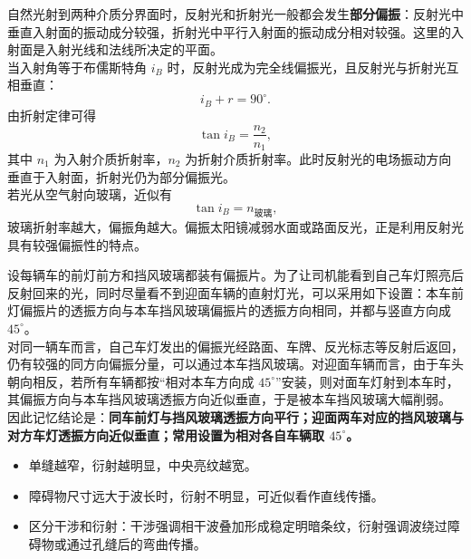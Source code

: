 \begin{casetypebox}[title={\strut\textcolor{white}{\bfseries 常见题型：反射、折射与偏振角}}]
自然光射到两种介质分界面时，反射光和折射光一般都会发生\textbf{部分偏振}：反射光中垂直入射面的振动成分较强，折射光中平行入射面的振动成分相对较强。这里的入射面是入射光线和法线所决定的平面。\\

当入射角等于布儒斯特角 $i_B$ 时，反射光成为完全线偏振光，且反射光与折射光互相垂直：
\[
  i_B+r=90^\circ.
\]
由折射定律可得
\[
  \tan i_B=\frac{n_2}{n_1},
\]
其中 $n_1$ 为入射介质折射率，$n_2$ 为折射介质折射率。此时反射光的电场振动方向垂直于入射面，折射光仍为部分偏振光。\\

若光从空气射向玻璃，近似有
\[
  \tan i_B=n_{\text{玻璃}},
\]
玻璃折射率越大，偏振角越大。偏振太阳镜减弱水面或路面反光，正是利用反射光具有较强偏振性的特点。
\end{casetypebox}

\begin{casetypebox}[title={\strut\textcolor{white}{\bfseries 常见题型：偏振防眩目车灯}}]
设每辆车的前灯前方和挡风玻璃都装有偏振片。为了让司机能看到自己车灯照亮后反射回来的光，同时尽量看不到迎面车辆的直射灯光，可以采用如下设置：本车前灯偏振片的透振方向与本车挡风玻璃偏振片的透振方向相同，并都与竖直方向成 $45^\circ$。\\

对同一辆车而言，自己车灯发出的偏振光经路面、车牌、反光标志等反射后返回，仍有较强的同方向偏振分量，可以通过本车挡风玻璃。对迎面车辆而言，由于车头朝向相反，若所有车辆都按“相对本车方向成 $45^\circ$”安装，则对面车灯射到本车时，其偏振方向与本车挡风玻璃透振方向近似垂直，于是被本车挡风玻璃大幅削弱。\\

因此记忆结论是：\textbf{同车前灯与挡风玻璃透振方向平行；迎面两车对应的挡风玻璃与对方车灯透振方向近似垂直；常用设置为相对各自车辆取 $45^\circ$。}
\end{casetypebox}

\begin{casetypebox}[title={\strut\textcolor{white}{\bfseries 常见题型：衍射}}]
\begin{itemize}[leftmargin=1.5em]
  \item 单缝越窄，衍射越明显，中央亮纹越宽。
  \item 障碍物尺寸远大于波长时，衍射不明显，可近似看作直线传播。
  \item 区分干涉和衍射：干涉强调相干波叠加形成稳定明暗条纹，衍射强调波绕过障碍物或通过孔缝后的弯曲传播。
\end{itemize}
\end{casetypebox}